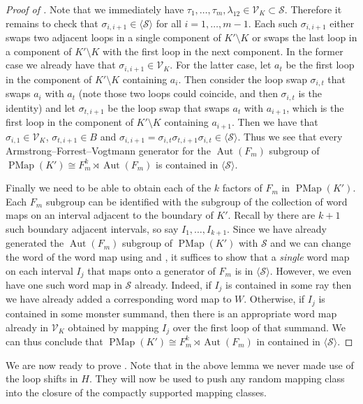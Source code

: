 \documentclass[11pt]{amsart}
\theoremstyle{plain}
\theoremstyle{definition}
\DeclareMathOperator{\Aut}{Aut}
\DeclareMathOperator{\PMap}{PMap}
\newcommand{\cV}{\mathcal{V}}
\newcommand{\cS}{\mathcal{S}}
\newcommand{\la}{\langle}
\newcommand{\ra}{\rangle}
\newcommand{\<}{\langle}
\renewcommand{\>}{\rangle}
\begin{document}
\begin{proof}[Proof of ]
    Note that we immediately have $\tau_{1},\ldots,\tau_m,\lambda_{12} \in \cV_{K} \subset \cS$. Therefore it remains to check that $\sigma_{i,i+1} \in \la \cS \ra$ for all $i=1,\ldots,m-1$. Each such $\sigma_{i,i+1}$ either swaps two adjacent loops in a single component of $K'\setminus K$ or swaps the last loop in a component of $K'\setminus K$ with the first loop in the next component. In the former case we already have that $\sigma_{i,i+1} \in \cV_{K}$. For the latter case, let $a_t$ be the first loop in the component of $K' \setminus K$ containing $a_i$.
    Then consider the loop swap $\sigma_{i,t}$ that swaps $a_i$ with $a_t$ (note those two loops could coincide, and then $\sigma_{i,t}$ is the identity) and let $\sigma_{t,i+1}$ be the loop swap that swaps $a_t$ with $a_{i+1}$, which is the first loop in the component of $K' \setminus K$ containing $a_{i+1}$. Then we have that $\sigma_{i,1} \in \cV_K$, $\sigma_{t,i+1} \in B$ and $\sigma_{i,i+1} = \sigma_{i,t} \sigma_{t,i+1} \sigma_{i,t} \in \la \cS\ra$. Thus we see that every Armstrong--Forrest--Vogtmann generator for the $\Aut(F_{m})$ subgroup of $\PMap(K') \cong F_{m}^{k} \rtimes \Aut(F_{m})$ is contained in $\la \cS \ra$. 

    Finally we need to be able to obtain each of the $k$ factors of $F_{m}$ in $\PMap(K')$. Each $F_{m}$ subgroup can be identified with the subgroup of the collection of word maps on an interval adjacent to the boundary of $K'$. Recall by  there are $k+1$ such boundary adjacent intervals, so say $I_1,\ldots,I_{k+1}$. Since we have already generated the $\Aut(F_{m})$ subgroup of $\PMap(K')$ with $\cS$ and we can change the word of the word map using  and , it suffices to show that a \emph{single} word map on each interval $I_j$ that maps onto a generator of $F_{m}$ is in $\la \cS \ra$.
    However, we even have one such word map in $\cS$ already. Indeed, if $I_j$ is contained in some ray then we have already added a corresponding word map to $W$. Otherwise, if $I_j$ is contained in some monster summand, then there is an appropriate word map already in $\cV_{K}$ obtained by mapping $I_j$ over the first loop of that summand. We can thus conclude that $\PMap(K') \cong F_{m}^{k} \rtimes \Aut(F_{m})$ in contained in $\la \cS \ra$. 
\end{proof}

We are now ready to prove . Note that in the above lemma we never made use of the loop shifts in $H$. They will now be used to push any random mapping class into the closure of the compactly supported mapping classes. 
\end{document}

